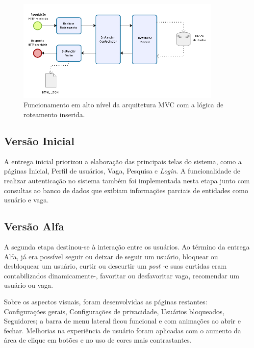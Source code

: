 \begin{figure}[h]
    \caption{ Funcionamento em alto nível da arquitetura MVC com a lógica de roteamento inserida.}
       	\begin{center}
            \includegraphics[width=0.9\textwidth]{figuras/roteamento.png}
        \end{center}
    \label{routeFramework}
\end{figure}


\subsection{Versão Inicial}
\label{implementacaoIR}

A entrega inicial priorizou a elaboração das principais telas do sistema, como a páginas Inicial, Perfil de usuários, Vaga, Pesquisa e \textit{Login}. A funcionalidade de realizar autenticação no sistema também foi implementada nesta etapa junto com consultas ao banco de dados que exibiam informações parciais de entidades como usuário e vaga.

\subsection{Versão Alfa}
\label{implementacaoAR}

A segunda etapa destinou-se à interação entre os usuários. Ao término da entrega Alfa, já era possível seguir ou deixar de seguir um usuário, bloquear ou desbloquear um usuário, curtir ou descurtir um \textit{post} -e suas curtidas eram contabilizados dinamicamente-, favoritar ou desfavoritar vaga, recomendar um usuário ou vaga. 

Sobre os aspectos visuais, foram desenvolvidas as páginas restantes: Configurações gerais, Configurações de privacidade, Usuários bloqueados, Seguidores; a barra de menu lateral ficou funcional e com animações ao abrir e fechar. Melhorias na experiência de usuário foram aplicadas com o aumento da área de clique em botões e no uso de cores mais contrastantes.

